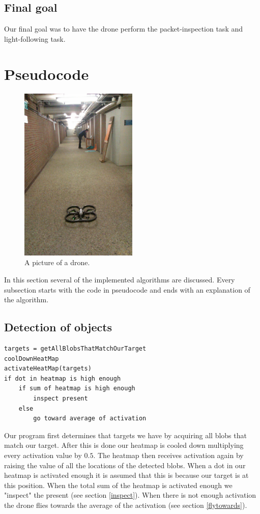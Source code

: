 \documentclass[a4paper,10pt]{article}
\begin{document}
\subsection{Final goal}
Our final goal was to have the drone perform the packet-inspection task and
light-following task.



\section{Pseudocode}

\begin{figure}[h!]
	\caption{A picture of a drone.}
	\centering
	\includegraphics[width=0.5\textwidth]{images/boringHallway}
\end{figure}

In this section several of the implemented algorithms are discussed. Every subsection starts with the code in pseudocode and ends with an explanation of the algorithm. 
\subsection{Detection of objects}
\begin{verbatim}
targets = getAllBlobsThatMatchOurTarget
coolDownHeatMap
activateHeatMap(targets)
if dot in heatmap is high enough
    if sum of heatmap is high enough
        inspect present
    else
        go toward average of activation
\end{verbatim}
Our program first determines that targets we have by acquiring all blobs that match our target.
After this is done our heatmap is cooled down multiplying every activation value by $0.5$. 
The heatmap then receives activation again by raising the value of all the locations of the detected blobs. 
When a dot in our heatmap is activated enough it is assumed that this is because our target is at this position. 
When the total sum of the heatmap is activated enough we "inspect" the present (see section \ref{inspect}). 
When there is not enough activation the drone flies towards the average of the activation (see section \ref{flytowards}).
\end{document}
